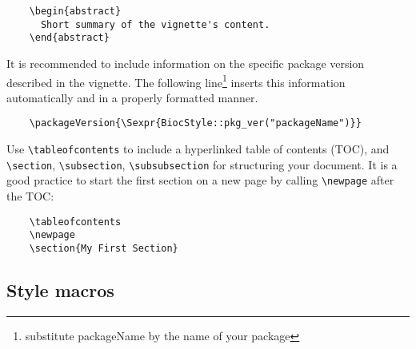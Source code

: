 \documentclass{article}
\newcommand\latex[1]{{\ttfamily #1}}
\begin{document}
\begin{verbatim}
    \begin{abstract}
      Short summary of the vignette's content.
    \end{abstract}
\end{verbatim}

It is recommended to include information on the specific 
package version described in the vignette. The following line\footnote{substitute 
\latex{packageName} by the name of your package} inserts
this information automatically and in a properly formatted manner.

\verb|    \packageVersion{\|\verb|Sexpr{BiocStyle::pkg_ver("packageName")}}|

Use \verb+\tableofcontents+ to include a hyperlinked table of contents (TOC), and
\verb+\section+, \verb+\subsection+, \verb+\subsubsection+ for
structuring your document.  It is a good practice to start the first section
on a new page by calling \verb+\newpage+ after the TOC:

\begin{verbatim}
    \tableofcontents
    \newpage
    \section{My First Section}
\end{verbatim}

\subsection{Style macros}
\end{document}
